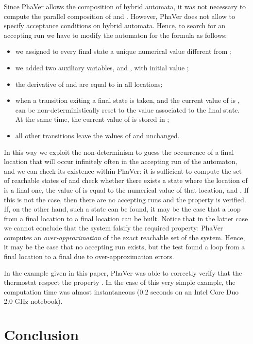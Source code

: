 \documentclass[submission,copyright,creativecommons]{eptcs}
\begin{document}
Since PhaVer allows the composition of hybrid automata, it was not necessary to compute the parallel composition of  and . However, PhaVer does not allow to specify acceptance conditions on hybrid automata. Hence, to search for an accepting run we have to modify the automaton for the formula as follows:
\begin{itemize}
	\item we assigned to every final state a unique numerical value different from ;
	\item we added two auxiliary variables,  and , with initial value ;
	\item the derivative of  and  are equal to  in all locations;
	\item when a transition exiting a final state is taken, and the current value of  is ,
		 can be non-deterministically reset to the value associated to the final state. At the same time, the current value of  is stored in ;
	\item all other transitions leave the values of  and  unchanged.
\end{itemize}

\noindent In this way we exploit the non-determinism to guess the occurrence of a final location that will occur infinitely often in the accepting run of the automaton, and we can check its existence within PhaVer: it is sufficient to compute the set of reachable states of  and check whether there exists a state where the location of  is a final one, the value of  is equal to the numerical value of that location, and . If this is not the case, then there are no accepting runs and 
the property is verified. If, on the other hand, such a state can be found, it may be the case that a loop from a final location to a final location can be built. Notice that in the latter case we cannot conclude that the system falsify the required property: PhaVer computes an \emph{over-approximation} of the exact reachable set of the system. Hence, it may be the case that no accepting run exists, but the test found a loop from a final location to a final due to over-approximation errors.

In the example given in this paper, PhaVer was able to correctly verify that the thermostat respect the property . In the case of this very simple example, the computation time was almost instantaneous (0.2 seconds on an Intel Core Duo 2.0 GHz notebook).

\section{Conclusion}
\end{document}
